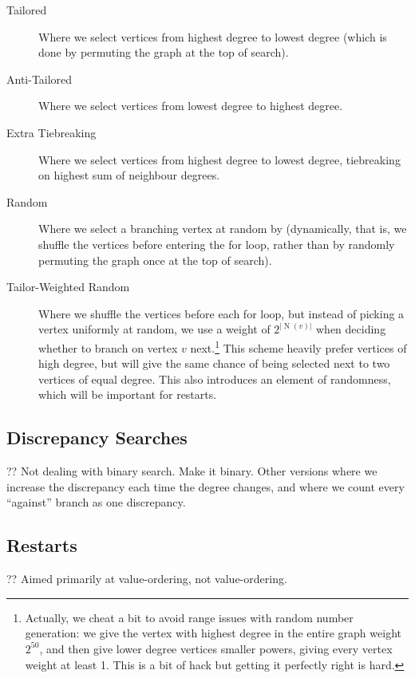 \documentclass{article}
\newcommand{\neighbourhood}{\operatorname{N}}
\begin{document}
\begin{description}
    \item[Tailored] Where we select vertices from highest degree to lowest degree (which is done by
        permuting the graph at the top of search).
    \item[Anti-Tailored] Where we select vertices from lowest degree to highest degree.
    \item[Extra Tiebreaking] Where we select vertices from highest degree to lowest degree,
        tiebreaking on highest sum of neighbour degrees.
    \item[Random] Where we select a branching vertex at random by (dynamically, that is, we shuffle
        the vertices before entering the for loop, rather than by randomly permuting the graph once at the
        top of search).
    \item[Tailor-Weighted Random] Where we shuffle the vertices before each for loop, but instead of
        picking a vertex uniformly at random, we use a weight of
        $2^{\left|\neighbourhood(v)\right|}$ when deciding whether to branch on vertex $v$
        next.\footnote{Actually, we cheat a bit to avoid range issues with random number generation:
        we give the vertex with highest degree in the entire graph weight $2^{50}$, and then give
        lower degree vertices smaller powers, giving every vertex weight at least 1. This is a bit
        of hack but getting it perfectly right is hard.} This scheme heavily prefer vertices of high
        degree, but will give the same chance of being selected next to two vertices of equal
        degree. This also introduces an element of randomness, which will be important for restarts.
\end{description}

\subsection{Discrepancy Searches}

?? Not dealing with binary search. Make it binary. Other versions where we increase the discrepancy
each time the degree changes, and where we count every ``against'' branch as one discrepancy.

\subsection{Restarts}

?? Aimed primarily at value-ordering, not value-ordering.
\end{document}
